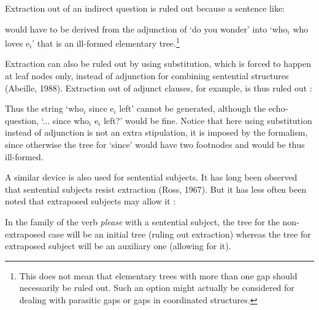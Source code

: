 Extraction out of an indirect question is ruled out because a sentence like:

\beginsentences
{}
\endsentences

\noindent would have to be derived from the adjunction of `do you wonder' into
`who$_{i}$ who loves e$_{i}$' that is an ill-formed elementary tree.\footnote{This does not mean that elementary
trees with more than one gap should necessarily be ruled out. Such an option  might actually 
be considered for dealing with
parasitic gaps or gaps in coordinated structures.}


Extraction can also be ruled out by using substitution, which is forced to
happen at leaf nodes only, instead of adjunction for combining
sentential structures (Abeille, 1988). Extraction out of adjunct clauses,
for example, is thus ruled out :


\noindent Thus the string `who$_{i}$ since e$_{i}$ left' cannot be generated,
although the echo-question, `... since who$_{i}$ e$_{i}$ left?'
would be fine. Notice that here using substitution instead of adjunction
is  not an extra stipulation, it is imposed by the formalism, since
otherwise the tree for `since' would have two footnodes and would be
thus ill-formed.

A similar device is also used for sentential subjects. It has long been
observed that sentential subjects resist extraction (Ross, 1967)\nocite{ross67}. But it
has less often been noted that extraposed subjects may allow it :

\beginsentences
{}
\endsentences

\beginsentences
{}
\endsentences

In the family of the verb {\it please} with a sentential subject, the tree for 
the non-extraposed case will be an initial tree (ruling out extraction) whereas the tree for extraposed subject will be an auxiliary one (allowing for it).


